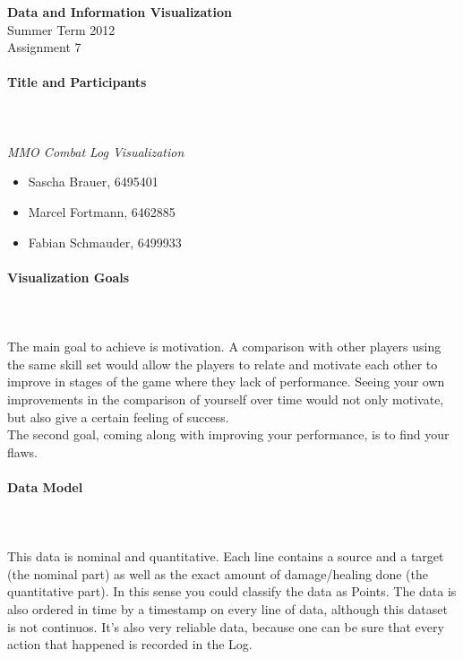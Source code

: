 \documentclass{scrartcl}
\begin{document}
\begin{center}
{\huge \textbf{Data and Information Visualization}}\\
Summer Term 2012\\
Assignment 7
\end{center}

\paragraph{Title and Participants}
\hfill \\ \hfill \\
\emph{MMO Combat Log Visualization}\\
\begin{itemize}
\item Sascha Brauer, 6495401
\item Marcel Fortmann, 6462885
\item Fabian Schmauder, 6499933
\end{itemize}

\paragraph{Visualization Goals}
\hfill \\ \hfill \\
The main goal to achieve is motivation. A comparison with other players using the same skill set would allow the players to relate and motivate each other to improve in stages of the game where they lack of performance. Seeing your own improvements in the comparison of yourself over time would not only motivate, but also give a certain feeling of success.\\
The second goal, coming along with improving your performance, is to find your flaws.

\paragraph{Data Model}
\hfill \\ \hfill \\
This data is nominal and quantitative. Each line contains a source and a target (the nominal part) as well as the exact amount of damage/healing done (the quantitative part). In this sense you could classify the data as Points. The data is also ordered in time by a timestamp on every line of data, although this dataset is not continuos. It's also very reliable data, because one can be sure that every action that happened is recorded in the Log. 
\end{document}
